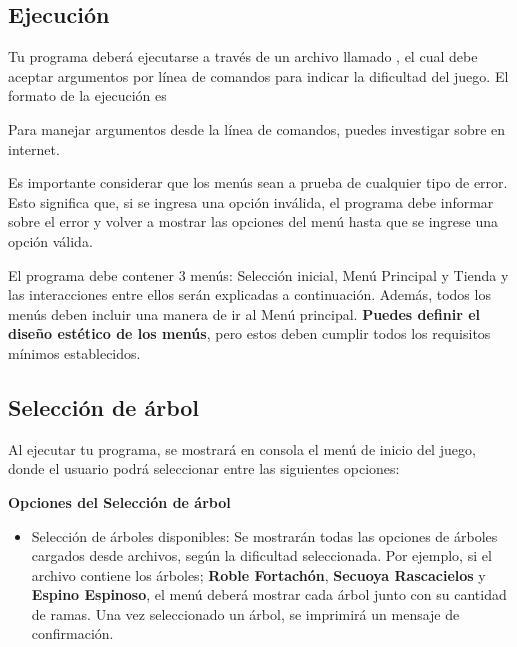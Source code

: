 \label{sec:menus}
\subsection{Ejecución}
\label{subsec:Ejecución}


Tu programa deberá ejecutarse a través de un archivo llamado , el cual debe aceptar argumentos por línea de comandos para indicar la dificultad del juego. El formato de la ejecución es 

Para manejar argumentos desde la línea de comandos, puedes investigar sobre  en internet.

Es importante considerar que los menús sean a prueba de cualquier tipo de error. Esto significa que, si se ingresa una opción inválida, el programa debe informar sobre el error y volver a mostrar las opciones del menú hasta que se ingrese una opción válida.

El programa debe contener 3 menús: Selección inicial, Menú Principal y Tienda y las interacciones entre ellos serán explicadas a continuación. Además, todos los menús deben incluir una manera de ir al Menú principal. \textbf{Puedes definir el diseño estético de los menús}, pero estos deben cumplir todos los requisitos mínimos establecidos.




\subsection{Selección de árbol}
\label{subsec:Selección de árbol}

Al ejecutar tu programa, se mostrará en consola el menú de inicio del juego, donde el usuario podrá seleccionar entre las siguientes opciones:

\textbf{Opciones del Selección de árbol}
    
\begin{itemize}

    \item Selección de árboles disponibles: Se mostrarán todas las opciones de árboles cargados desde archivos, según la dificultad seleccionada. Por ejemplo, si el archivo contiene los árboles; \textbf{Roble Fortachón}, \textbf{Secuoya Rascacielos} y \textbf{ Espino Espinoso}, el menú deberá mostrar cada árbol junto con su cantidad de ramas. Una vez seleccionado un árbol, se imprimirá un mensaje de confirmación. 

\end{itemize}


